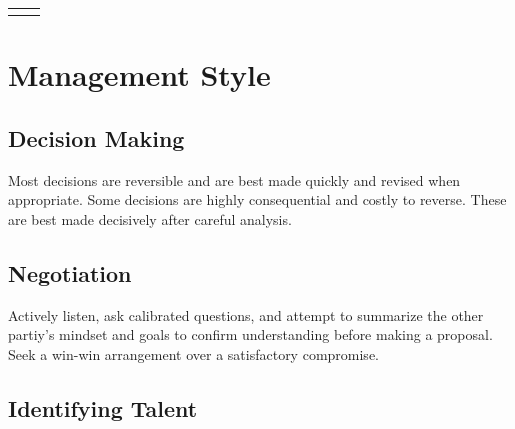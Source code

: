 \documentclass[
	10pt, %
]{FreemanCV}
\begin{document}
\begin{paracol}{2}
\begin{supertabular}{r l}







\end{supertabular}


\section{Management Style}

\subsection{Decision Making}

Most decisions are reversible and are best made quickly and revised when appropriate. Some decisions are highly consequential and costly to reverse. These are best made decisively after careful analysis.

\subsection{Negotiation}

Actively listen, ask calibrated questions, and attempt to summarize the other partiy's mindset and goals to confirm understanding before making a proposal. Seek a win-win arrangement over a satisfactory compromise.

\subsection{Identifying Talent}


\end{paracol}
\end{document}

